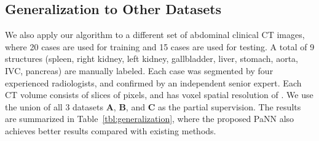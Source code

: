 \documentclass[10pt,twocolumn,letterpaper]{article}
\begin{document}
\subsection{Generalization to Other Datasets}
\label{sec:generalization}

\begin{table}[!tb]
\small
\centering
{}
\caption{Performance comparison on a newly collected dataset. Full results are included in the appendix.}
\label{tbl:generalization}
\vspace{-1.7em}
\end{table}

We also apply our algorithm to a different set of abdominal clinical CT images, where 20 cases are used for training and 15 cases are used for testing. A total of 9 structures (spleen, right kidney, left kidney, gallbladder, liver, stomach, aorta, IVC, pancreas) are manually labeled. Each case was segmented by four experienced radiologists, and confirmed by an independent senior expert. Each CT volume consists of  slices of  pixels, and has voxel spatial resolution of . We use the union of all 3 datasets \textbf{A}, \textbf{B}, and \textbf{C} as the partial supervision. The results are summarized in Table~\ref{tbl:generalization}, where the proposed PaNN also achieves better results compared with existing methods.
\end{document}
